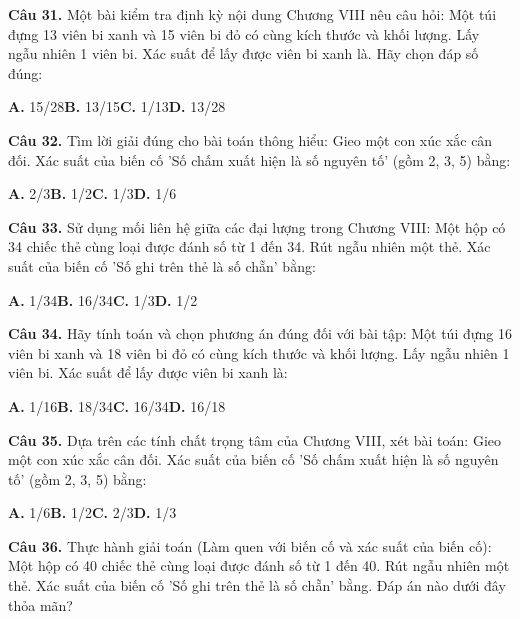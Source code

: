 \documentclass[11pt,a4paper]{article}
\begin{document}
\textbf{\color{primary} Câu 31.} Một bài kiểm tra định kỳ nội dung Chương VIII nêu câu hỏi: Một túi đựng 13 viên bi xanh và 15 viên bi đỏ có cùng kích thước và khối lượng. Lấy ngẫu nhiên 1 viên bi. Xác suất để lấy được viên bi xanh là. Hãy chọn đáp số đúng:\par
\hspace*{1.5em}\textbf{A.} 15/28\quad\quad \textbf{B.} 13/15\quad\quad \textbf{C.} 1/13\quad\quad \textbf{D.} 13/28\par\vspace{2pt}
\textbf{\color{primary} Câu 32.} Tìm lời giải đúng cho bài toán thông hiểu: Gieo một con xúc xắc cân đối. Xác suất của biến cố 'Số chấm xuất hiện là số nguyên tố' (gồm 2, 3, 5) bằng:\par
\hspace*{1.5em}\textbf{A.} 2/3\quad\quad \textbf{B.} 1/2\quad\quad \textbf{C.} 1/3\quad\quad \textbf{D.} 1/6\par\vspace{2pt}
\textbf{\color{primary} Câu 33.} Sử dụng mối liên hệ giữa các đại lượng trong Chương VIII: Một hộp có 34 chiếc thẻ cùng loại được đánh số từ 1 đến 34. Rút ngẫu nhiên một thẻ. Xác suất của biến cố 'Số ghi trên thẻ là số chẵn' bằng:\par
\hspace*{1.5em}\textbf{A.} 1/34\quad\quad \textbf{B.} 16/34\quad\quad \textbf{C.} 1/3\quad\quad \textbf{D.} 1/2\par\vspace{2pt}
\textbf{\color{primary} Câu 34.} Hãy tính toán và chọn phương án đúng đối với bài tập: Một túi đựng 16 viên bi xanh và 18 viên bi đỏ có cùng kích thước và khối lượng. Lấy ngẫu nhiên 1 viên bi. Xác suất để lấy được viên bi xanh là:\par
\hspace*{1.5em}\textbf{A.} 1/16\quad\quad \textbf{B.} 18/34\quad\quad \textbf{C.} 16/34\quad\quad \textbf{D.} 16/18\par\vspace{2pt}
\textbf{\color{primary} Câu 35.} Dựa trên các tính chất trọng tâm của Chương VIII, xét bài toán: Gieo một con xúc xắc cân đối. Xác suất của biến cố 'Số chấm xuất hiện là số nguyên tố' (gồm 2, 3, 5) bằng:\par
\hspace*{1.5em}\textbf{A.} 1/6\quad\quad \textbf{B.} 1/2\quad\quad \textbf{C.} 2/3\quad\quad \textbf{D.} 1/3\par\vspace{2pt}
\textbf{\color{primary} Câu 36.} Thực hành giải toán (Làm quen với biến cố và xác suất của biến cố): Một hộp có 40 chiếc thẻ cùng loại được đánh số từ 1 đến 40. Rút ngẫu nhiên một thẻ. Xác suất của biến cố 'Số ghi trên thẻ là số chẵn' bằng. Đáp án nào dưới đây thỏa mãn?\par
\end{document}

